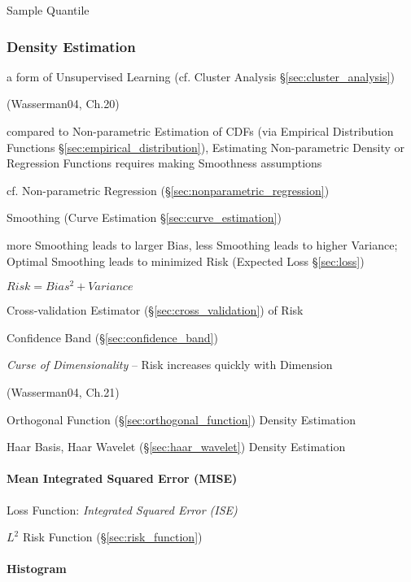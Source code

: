 Sample Quantile



\subsubsection{Density Estimation}\label{sec:density_estimation}

a form of Unsupervised Learning (cf. Cluster Analysis
\S\ref{sec:cluster_analysis})

(Wasserman04, Ch.20)

compared to Non-parametric Estimation of CDFs (via Empirical Distribution
Functions \S\ref{sec:empirical_distribution}), Estimating Non-parametric Density
or Regression Functions requires making Smoothness assumptions

cf. Non-parametric Regression (\S\ref{sec:nonparametric_regression})

Smoothing (Curve Estimation \S\ref{sec:curve_estimation})

more Smoothing leads to larger Bias, less Smoothing leads to higher Variance;
Optimal Smoothing leads to minimized Risk (Expected Loss \S\ref{sec:loss})

$Risk = Bias^2 + Variance$

Cross-validation Estimator (\S\ref{sec:cross_validation}) of Risk

Confidence Band (\S\ref{sec:confidence_band})

\emph{Curse of Dimensionality} -- Risk increases quickly with Dimension

(Wasserman04, Ch.21)

Orthogonal Function (\S\ref{sec:orthogonal_function}) Density Estimation

Haar Basis, Haar Wavelet (\S\ref{sec:haar_wavelet}) Density
Estimation



\paragraph{Mean Integrated Squared Error (MISE)}\label{sec:mise}\hfill

Loss Function: \emph{Integrated Squared Error (ISE)}

$L^2$ Risk Function (\S\ref{sec:risk_function})



\paragraph{Histogram}\label{sec:histogram}\hfill

